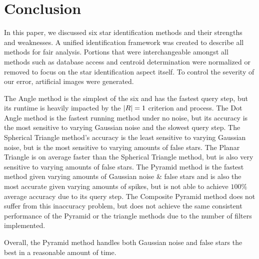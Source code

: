 \section{Conclusion}\label{sec:conclusion}
In this paper, we discussed six star identification methods and their strengths and weaknesses.
A unified identification framework was created to describe all methods for fair analysis.
Portions that were interchangeable amongst all methods such as database access and centroid determination were
normalized or removed to focus on the star identification aspect itself.
To control the severity of our error, artificial images were generated.

The Angle method is the simplest of the six and has the fastest query step, but its runtime is heavily impacted by
the $\left| R \right| = 1$ criterion and  process.
The Dot Angle method is the fastest running method under no noise, but its accuracy is the most sensitive to varying
Gaussian noise and the slowest query step.
The Spherical Triangle method's accuracy is the least sensitive to varying Gaussian noise, but is the most sensitive
to varying amounts of false stars.
The Planar Triangle is on average faster than the Spherical Triangle method, but is also very sensitive to varying
amounts of false stars.
The Pyramid method is the fastest method given varying amounts of Gaussian noise \& false stars and is also the most
accurate given varying amounts of spikes, but is not able to achieve $100\%$ average accuracy due to its query step.
The Composite Pyramid method does not suffer from this inaccuracy problem, but does not achieve the same consistent
performance of the Pyramid or the triangle methods due to the number of filters implemented.

Overall, the Pyramid method handles both Gaussian noise and false stars the best in a reasonable amount of time.
